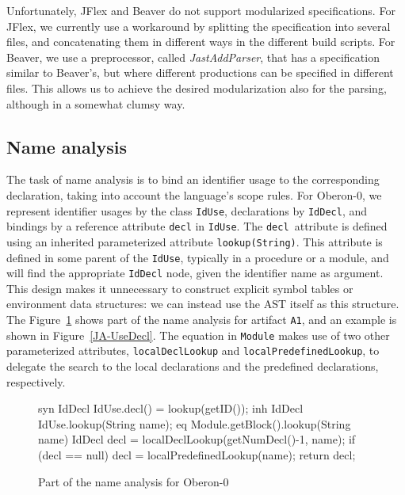 Unfortunately, JFlex and Beaver do not support modularized specifications. For JFlex, we currently use a workaround by splitting the specification into several files, and concatenating them in different ways in the different build scripts. For Beaver, we use a preprocessor, called \emph{JastAddParser}, that has a specification similar to Beaver's, but where different productions can be specified in different files. This allows us to achieve the desired modularization also for the parsing, although in a somewhat clumsy way.


%
%
\subsection{Name analysis}
\label{JA-NameAnalysis}
The task of name analysis is to bind an identifier usage to the corresponding declaration,
taking into account the language's scope rules. For Oberon-0, we represent identifier usages by the class \texttt{IdUse}, declarations by \texttt{IdDecl}, and bindings by a reference attribute \texttt{decl} in \texttt{IdUse}. The \texttt{decl }attribute is defined using an inherited parameterized attribute \texttt{lookup(String)}. This attribute is defined in some parent of the \texttt{IdUse}, typically in a procedure or a module, and will find the appropriate \texttt{IdDecl} node, given the identifier name as argument. This design makes it unnecessary to construct explicit symbol tables or environment data structures: we can instead use the AST itself as this structure. The Figure~\ref{JA-DeclNameAnalysis} shows part of the name analysis for artifact \texttt{A1}, and an example is shown in Figure~\ref{JA-UseDecl}. The equation in \texttt{Module} makes use of two other parameterized attributes, \texttt{localDeclLookup} and \texttt{localPredefinedLookup}, to delegate the search to the local declarations and the predefined declarations, respectively.

\begin{figure}
\begin{jastaddcode}
syn IdDecl IdUse.decl() = lookup(getID());
inh IdDecl IdUse.lookup(String name);
eq Module.getBlock().lookup(String name) {
    IdDecl decl = localDeclLookup(getNumDecl()-1, name);
    if (decl == null) decl = localPredefinedLookup(name);
    return decl;
}
\end{jastaddcode}
\vspace{-15pt}
\caption{Part of the name analysis for Oberon-0}
\label{JA-DeclNameAnalysis}
\end{figure}

